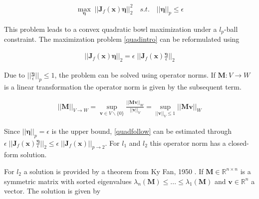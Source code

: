 \begin{equation}
\begin{aligned}
	\max_{\bm{\eta}} \; \lvert\lvert \bm{J}_f(\bm{x}) \bm{\eta} \rvert\rvert_2^2 \quad s.t. \quad \lvert\lvert \bm{\eta} \rvert\rvert_p \leq \epsilon
\end{aligned}
\label{quadintro}
\end{equation}

\begingroup
This problem leads to a convex quadratic bowl maximization under a $l_p$-ball constraint. The maximization problem \ref{quadintro} can be reformulated using
\endgroup

\begin{equation}
\begin{aligned}
	\lvert\lvert \bm{J}_f(\bm{x}) \bm{\eta} \rvert\rvert_2 = \epsilon \; \lvert\lvert \bm{J}_f(\bm{x}) \frac{\bm{\eta}}{\epsilon} \rvert\rvert_2
\end{aligned}
\label{quadfollow}
\end{equation}

\begingroup
Due to $\lvert\lvert \frac{\bm{\eta}}{\epsilon} \rvert\rvert_p \leq 1$, the problem can be solved using operator norms. If
$\bm{M}: V \rightarrow W$ is a linear transformation the operator norm is given by the subsequent term.
\endgroup

\begin{equation}
\begin{aligned}
	\lvert\lvert \bm{M} \rvert\rvert_{V \rightarrow W} = \sup_{\bm{v} \in V \backslash \{0\}} \frac{\lvert\lvert \bm{M v} \rvert\rvert_W}{\lvert\lvert \bm{v} \rvert\rvert_V} = \sup_{\lvert\lvert \bm{v} \rvert\rvert_V \leq 1} \lvert\lvert \bm{M v}  \rvert\rvert_W
\end{aligned}
\label{operatornorm}
\end{equation}

\begingroup
Since $\lvert\lvert \bm{\eta} \rvert\rvert_p = \epsilon$ is the upper bound, \ref{quadfollow} can be estimated through $\epsilon \; \lvert\lvert \bm{J}_f(\bm{x}) \frac{\bm{\eta}}{\epsilon} \rvert\rvert_2 \leq \epsilon \; \lvert\lvert \bm{J}_f(\bm{x}) \rvert\rvert_{p \rightarrow 2}$.
For $l_1$ and $l_2$ this operator norm has a closed-form solution.

For $l_2$ a solution is provided by a theorem from Ky Fan, 1950 \cite{KyFan, BigData}. If $\bm{M} \in \mathbb{R}^{n \times n}$ is a symmetric matrix with sorted
eigenvalues $\lambda_n (\bm{M}) \leq ... \leq \lambda_1 (\bm{M})$ and $\bm{v} \in \mathbb{R}^n$ a vector. The solution is given by
\endgroup

